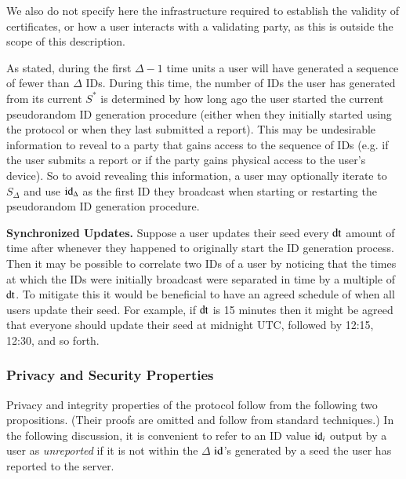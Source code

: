 \documentclass{article}
\begin{document}
We also do not specify here the infrastructure required to establish the validity of certificates, or how a user interacts with a validating party, as this is outside the scope of this description. 

As stated, during the first $\Delta-1$ time units a user will have generated a sequence of fewer than $\Delta$ IDs.
During this time, the number of IDs the user has generated from its current $S^\ast$ is determined by how long ago the user started the current pseudorandom ID generation procedure (either when they initially started using the protocol or when they last submitted a report).   
This may be undesirable information to reveal to a party that gains access to the sequence of IDs (e.g. if the user submits a report or if the party gains physical access to the user's device). 
So to avoid revealing this information, a user may optionally iterate to $S_{\Delta}$ and use $\mathrm{id}_{\Delta}$ as the first ID they broadcast when starting or restarting the pseudorandom ID generation procedure.

{\bf Synchronized Updates.}
Suppose a user updates their seed every $\mathrm{dt}$ amount of time after whenever they happened to originally start the ID generation process.
Then it may be possible to correlate two IDs of a user by noticing that the times at which the IDs were initially broadcast were separated in time by a multiple of $\mathrm{dt}$.
To mitigate this it would be beneficial to have an agreed schedule of when all users update their seed.
For example, if $\mathrm{dt}$ is 15 minutes then it might be agreed that everyone should update their seed at midnight UTC, followed by 12:15, 12:30, and so forth.



\subsubsection{Privacy and Security Properties}

Privacy and integrity properties of the protocol follow from the following two propositions. (Their proofs are omitted and follow from standard techniques.) In the following discussion, it is convenient to refer to an ID value $\mathrm{id}_i$ output by a user as {\em unreported} if it is not within the $\Delta$ $\mathrm{id}$'s generated by a seed the user has reported to the server. 
\end{document}
